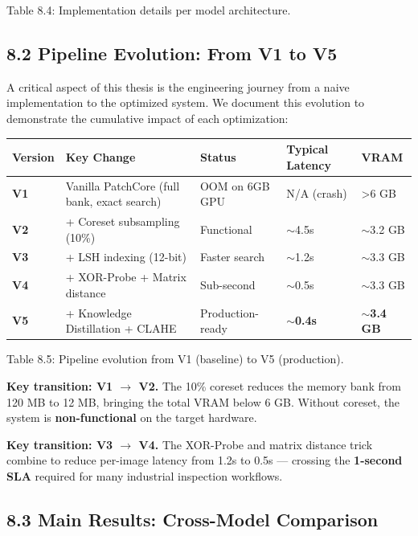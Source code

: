 \documentclass[12pt, a4paper, oneside]{report}
\begin{document}
Table 8.4: Implementation details per model architecture.

\bigskip\noindent\hrulefill\bigskip

\subsection{8.2 Pipeline Evolution: From V1 to V5}\label{pipeline-evolution-from-v1-to-v5}

A critical aspect of this thesis is the engineering journey from a naive implementation to the optimized system. We document this evolution to demonstrate the cumulative impact of each optimization:

{\def\LTcaptype{none} %
\begin{longtable}[]{@{}lllll@{}}
\toprule\noalign{}
Version & Key Change & Status & Typical Latency & VRAM \\
\midrule\noalign{}
\endhead
\bottomrule\noalign{}
\endlastfoot
\textbf{V1} & Vanilla PatchCore (full bank, exact search) & OOM on 6GB GPU & N/A (crash) & \textgreater6 GB \\
\textbf{V2} & + Coreset subsampling (10\%) & Functional & ${\sim}$4.5s & ${\sim}$3.2 GB \\
\textbf{V3} & + LSH indexing (12-bit) & Faster search & ${\sim}$1.2s & ${\sim}$3.3 GB \\
\textbf{V4} & + XOR-Probe + Matrix distance & Sub-second & ${\sim}$0.5s & ${\sim}$3.3 GB \\
\textbf{V5} & + Knowledge Distillation + CLAHE & Production-ready & \textbf{${\sim}$0.4s} & \textbf{${\sim}$3.4 GB} \\
\end{longtable}
}

Table 8.5: Pipeline evolution from V1 (baseline) to V5 (production).

\textbf{Key transition: V1 $\rightarrow$ V2.} The 10\% coreset reduces the memory bank from 120 MB to 12 MB, bringing the total VRAM below 6 GB. Without coreset, the system is \textbf{non-functional} on the target hardware.

\textbf{Key transition: V3 $\rightarrow$ V4.} The XOR-Probe and matrix distance trick combine to reduce per-image latency from 1.2s to 0.5s --- crossing the \textbf{1-second SLA} required for many industrial inspection workflows.

\bigskip\noindent\hrulefill\bigskip

\subsection{8.3 Main Results: Cross-Model Comparison}\label{main-results-cross-model-comparison}
\end{document}
